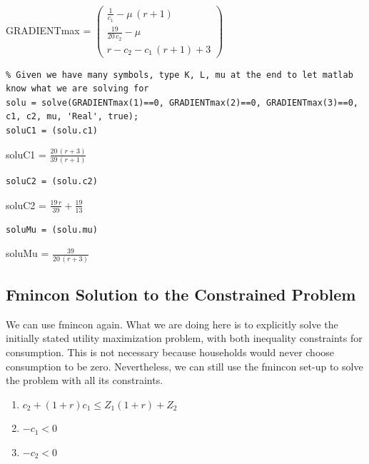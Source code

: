 \documentclass[
]{book}
\begin{document}
GRADIENTmax = \(\displaystyle \left(\begin{array}{c} \frac{1}{c_1 }-\mu \,{\left(r+1\right)}\\ \frac{19}{20\,c_2 }-\mu \\ r-c_2 -c_1 \,{\left(r+1\right)}+3 \end{array}\right)\)

\begin{verbatim}
% Given we have many symbols, type K, L, mu at the end to let matlab know what we are solving for
solu = solve(GRADIENTmax(1)==0, GRADIENTmax(2)==0, GRADIENTmax(3)==0, c1, c2, mu, 'Real', true);
soluC1 = (solu.c1)
\end{verbatim}

soluC1 =
\(\displaystyle \frac{20\,{\left(r+3\right)}}{39\,{\left(r+1\right)}}\)

\begin{verbatim}
soluC2 = (solu.c2)
\end{verbatim}

soluC2 = \(\displaystyle \frac{19\,r}{39}+\frac{19}{13}\)

\begin{verbatim}
soluMu = (solu.mu)
\end{verbatim}

soluMu = \(\displaystyle \frac{39}{20\,{\left(r+3\right)}}\)

\hypertarget{fmincon-solution-to-the-constrained-problem}{%
\subsection{Fmincon Solution to the Constrained Problem}\label{fmincon-solution-to-the-constrained-problem}}

We can use fmincon again. What we are doing here is to explicitly solve
the initially stated utility maximization problem, with both inequality
constraints for consumption. This is not necessary because households
would never choose consumption to be zero. Nevertheless, we can still
use the fmincon set-up to solve the problem with all its constraints.

\begin{enumerate}
\def\labelenumi{\arabic{enumi}.}
\item
  \(\displaystyle c_2 +(1+r)c_1 \le Z_1 (1+r)+Z_2\)
\item
  \(\displaystyle -c_1 <0\)
\item
  \(\displaystyle -c_2 <0\)
\end{enumerate}
\end{document}
